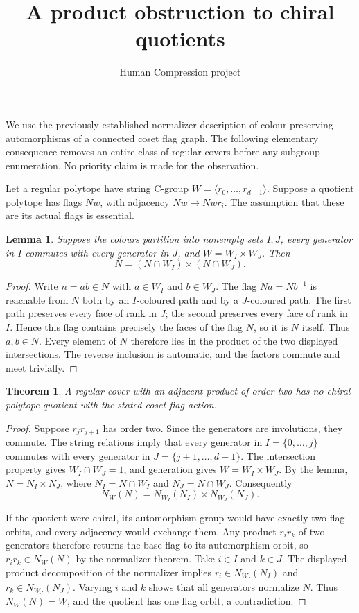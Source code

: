 \documentclass[11pt,a4paper]{article}
\title{A product obstruction to chiral quotients}
\author{Human Compression project}\date{}
\newtheorem{lemma}{Lemma}\newtheorem{theorem}{Theorem}
\begin{document}
\maketitle
We use the previously established normalizer description of
colour-preserving automorphisms of a connected coset flag graph.
The following elementary consequence removes an entire class of
regular covers before any subgroup enumeration. No priority claim is
made for the observation.

Let a regular polytope have string C-group
$W=\langle r_0,\ldots,r_{d-1}\rangle$. Suppose a quotient polytope
has flags $Nw$, with adjacency $Nw\mapsto Nwr_i$. The assumption that
these are its actual flags is essential.

\begin{lemma}
Suppose the colours partition into nonempty sets $I,J$, every generator
in $I$ commutes with every generator in $J$, and
$W=W_I\times W_J$. Then
\[
 N=(N\cap W_I)\times(N\cap W_J).
\]
\end{lemma}
\begin{proof}
Write $n=ab\in N$ with $a\in W_I$ and $b\in W_J$. The flag
$Na=Nb^{-1}$ is reachable from $N$ both by an $I$-coloured path and
by a $J$-coloured path. The first path preserves every face of rank in
$J$; the second preserves every face of rank in $I$. Hence this flag
contains precisely the faces of the flag $N$, so it is $N$ itself.
Thus $a,b\in N$. Every element of $N$ therefore lies in the product
of the two displayed intersections. The reverse inclusion is automatic,
and the factors commute and meet trivially.
\end{proof}

\begin{theorem}
A regular cover with an adjacent product of order two has no chiral
polytope quotient with the stated coset flag action.
\end{theorem}
\begin{proof}
Suppose $r_jr_{j+1}$ has order two. Since the generators are
involutions, they commute. The string relations imply that every
generator in $I=\{0,\ldots,j\}$ commutes with every generator in
$J=\{j+1,\ldots,d-1\}$. The intersection property gives
$W_I\cap W_J=1$, and generation gives $W=W_I\times W_J$.
By the lemma, $N=N_I\times N_J$, where $N_I=N\cap W_I$ and
$N_J=N\cap W_J$. Consequently
\[
 N_W(N)=N_{W_I}(N_I)\times N_{W_J}(N_J).
\]

If the quotient were chiral, its automorphism group would have exactly
two flag orbits, and every adjacency would exchange them. Any product
$r_ir_k$ of two generators therefore returns the base flag to its
automorphism orbit, so $r_ir_k\in N_W(N)$ by the normalizer theorem.
Take $i\in I$ and $k\in J$. The displayed product decomposition of
the normalizer implies $r_i\in N_{W_I}(N_I)$ and
$r_k\in N_{W_J}(N_J)$. Varying $i$ and $k$ shows that all generators
normalize $N$. Thus $N_W(N)=W$, and the quotient has one flag orbit,
a contradiction.
\end{proof}
\end{document}
